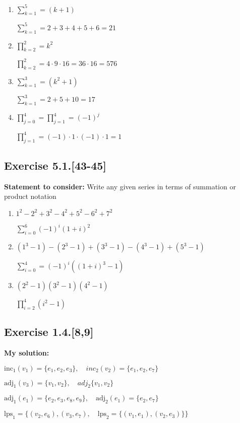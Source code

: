 \documentclass{report}
\newcommand{\cent}[1]{\begin{center}#1\end{center}}
\newcommand{\assignmentDescription}{\textbf{Statement to consider: }}
\newcommand{\solution}{\textbf{My solution: }}
\newcommand{\Exercise}[1]{\subsection{Exercise #1}}
\newcommand{\parenthesis}[1]{\left( #1 \right)}
\begin{document}
	\begin{enumerate}
		\item $\sum_{k=1}^{5} = (k+1)$
		
		\cent{$\sum_{k=1}^{5} = 2+3+4+5+6 = 21$}
		
		\item $\prod_{k=2}^{2} = k^2$
		
		\cent{$\prod_{k=2}^{2} = 4 \cdot 9 \cdot 16 = 36 \cdot 16 = 576$}
		
		\item $\sum_{k=1}^{3} = \parenthesis{k^2 + 1}$
		
		\cent{$\sum_{k=1}^{3} = 2 + 5 + 10 = 17$}
		
		\item $\prod_{j=0}^{4} = \prod_{j=1}^{4} = (-1)^j   $
		
		\cent{$\prod_{j=1}^{4} =  (-1) \cdot 1 \cdot  (-1) \cdot 1 = 1$}
		
	\end{enumerate}
	
	\Exercise{5.1.[43-45]}
	
	\assignmentDescription
	Write any given series in terms of summation or product notation
	
	\begin{enumerate}
		\item $1^2 - 2^2 + 3^2 - 4^2 + 5^2 - 6^2 + 7^2$
		
		\cent{$\sum_{i=0}^{6} (-1)^i (1+i)^2$}
		
		\item $(1^3-1)-(2^3-1)+(3^3-1)-(4^3 - 1) + (5^3 -1)$
		
		\cent{$\sum_{i=0}^{4} = (-1)^i \parenthesis{(1+i)^3 -1}$}
		
		\item $\parenthesis{2^2-1}\parenthesis{3^2 -1} \parenthesis{4^2 -1}$
		
		\cent{$\prod_{i=2}^{4} (i^2 -1)$}
		
	\end{enumerate}
	
	\Exercise{1.4.[8,9]}
	\solution
	\cent{$\text{inc}_1(v_1) = \{e_1,e_2,e_3\}, \quad inc_2(v_2) = \{e_1,e_2,e_7\}$}
	
	\cent{$\text{adj}_1(v_3) = \{v_1,v_2\}, \quad adj_2\{v_1,v_2\}$}
	
	\cent{$\text{adj}_1(e_1) = \{e_2,e_3,e_8,e_9\}, \quad \text{adj}_2(e_1) = \{e_2,e_7\}$}
	
	\cent{$\text{lps}_1 = \{(v_2,e_6),(v_3,e_7), \quad \text{lps}_2 = \{(v_1,e_1),(v_2,e_3)\}\}$}
	
\end{document}
